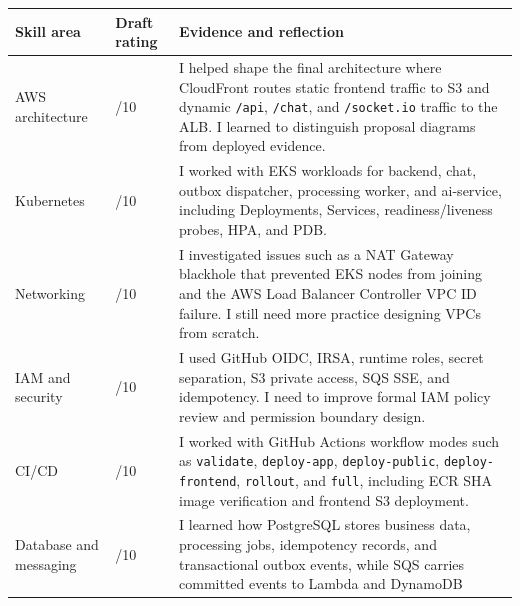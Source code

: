 {
\begingroup
\small
\setlength{\tabcolsep}{3pt}
\renewcommand{\arraystretch}{1.15}
\begin{longtable}{@{}
  >{\raggedright\arraybackslash}p{}
  >{\raggedleft\arraybackslash}p{}
  >{\raggedright\arraybackslash}p{}@{}}
\toprule\noalign{}
\begin{minipage}[b]{\linewidth}\raggedright
Skill area
\end{minipage} & \begin{minipage}[b]{\linewidth}\raggedleft
Draft rating
\end{minipage} & \begin{minipage}[b]{\linewidth}\raggedright
Evidence and reflection
\end{minipage} \\
\midrule\noalign{}
\endhead
\bottomrule\noalign{}
\endlastfoot
AWS architecture & 8/10 & I helped shape the final architecture where
CloudFront routes static frontend traffic to S3 and dynamic
\texttt{/\allowbreak{}api}, \texttt{/\allowbreak{}chat}, and \texttt{/\allowbreak{}socket.\allowbreak{}io} traffic to the
ALB. I learned to distinguish proposal diagrams from deployed
evidence. \\
Kubernetes & 8/10 & I worked with EKS workloads for backend, chat,
outbox dispatcher, processing worker, and ai-service, including
Deployments, Services, readiness/liveness probes, HPA, and PDB. \\
Networking & 7/10 & I investigated issues such as a NAT Gateway
blackhole that prevented EKS nodes from joining and the AWS Load
Balancer Controller VPC ID failure. I still need more practice designing
VPCs from scratch. \\
IAM and security & 7/10 & I used GitHub OIDC, IRSA, runtime roles,
secret separation, S3 private access, SQS SSE, and idempotency. I need
to improve formal IAM policy review and permission boundary design. \\
CI/CD & 8/10 & I worked with GitHub Actions workflow modes such as
\texttt{validate}, \texttt{deploy-\allowbreak{}app}, \texttt{deploy-\allowbreak{}public},
\texttt{deploy-\allowbreak{}frontend}, \texttt{rollout}, and \texttt{full}, including
ECR SHA image verification and frontend S3 deployment. \\
Database and messaging & 8/10 & I learned how PostgreSQL stores business
data, processing jobs, idempotency records, and transactional outbox
events, while SQS carries committed events to Lambda and DynamoDB

\end{longtable}}
